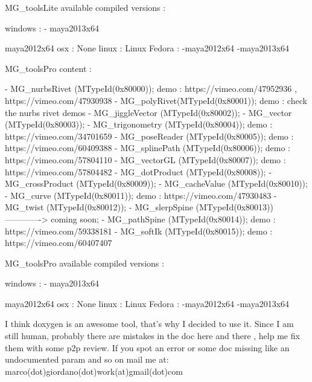M\-G\-\_\-tools\-Lite available compiled versions \-:

windows \-: -\/ maya2013x64
\begin{DoxyItemize}
\item maya2012x64 osx \-: None linux \-: Linux Fedora \-: -\/maya2012x64 -\/maya2013x64
\end{DoxyItemize}

M\-G\-\_\-tools\-Pro content \-: \begin{DoxyVerb}- MG_nurbsRivet (MTypeId(0x80000));          demo : https://vimeo.com/47952936 , https://vimeo.com/47930938
- MG_polyRivet(MTypeId(0x80001));            demo : check the nurbs rivet demos
- MG_jiggleVector  (MTypeId(0x80002));
- MG_vector  (MTypeId(0x80003));
- MG_trigonometry  (MTypeId(0x80004));       demo : https://vimeo.com/34701659
- MG_poseReader  (MTypeId(0x80005));         demo : https://vimeo.com/60409388
- MG_splinePath  (MTypeId(0x80006));         demo : https://vimeo.com/57804110
- MG_vectorGL (MTypeId(0x80007));            demo : https://vimeo.com/57804482
- MG_dotProduct  (MTypeId(0x80008)); 
- MG_crossProduct  (MTypeId(0x80009)); 
- MG_cacheValue  (MTypeId(0x80010)); 
- MG_curve  (MTypeId(0x80011));              demo : https://vimeo.com/47930483
- MG_twist  (MTypeId(0x80012));
- MG_slerpSpine  (MTypeId(0x80013)) -------------> coming soon; 
- MG_pathSpine  (MTypeId(0x80014));          demo : https://vimeo.com/59338181
- MG_softIk  (MTypeId(0x80015));             demo : https://vimeo.com/60407407
\end{DoxyVerb}
 M\-G\-\_\-tools\-Pro available compiled versions \-:

windows \-: -\/ maya2013x64
\begin{DoxyItemize}
\item maya2012x64 osx \-: None linux \-: Linux Fedora \-: -\/maya2012x64 -\/maya2013x64
\end{DoxyItemize}

I think doxygen is an awesome tool, that's why I decided to use it. Since I am still human, probably there are mistakes in the doc here and there , help me fix them with some p2p review. If you spot an error or some doc missing like an undocumented param and so on mail me at\-: marco(dot)giordano(dot)work(at)gmail(dot)com 